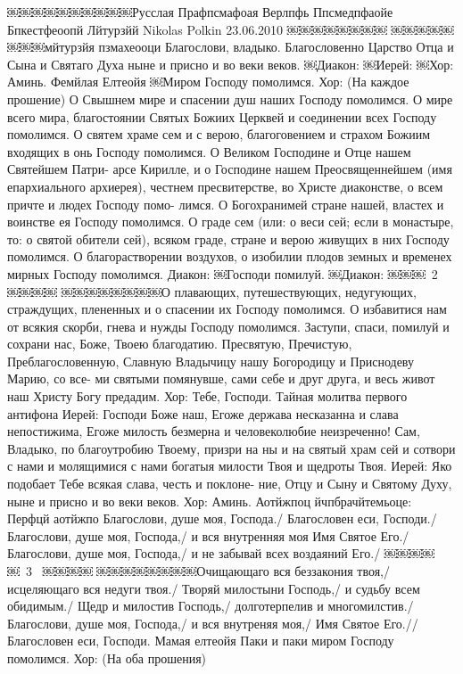 ￼￼￼￼￼￼￼￼￼￼Русслая Прафпсмафоая Верлпфь
Ппсмедпфаойе Бпкестфеоопй Лйтурзйй
Nikolas Polkin 23.06.2010
￼￼￼￼￼￼￼￼
￼￼￼￼￼￼￼￼мйтурзйя пзмахеооци
Благослови, владыко.
Благословенно Царство Отца и Сына и Святаго
Духа ныне и присно и во веки веков.
￼Диакон:
￼Иерей:
￼Хор: Аминь.
Фемйлая Елтеойя
￼Миром Господу помолимся.
Хор: (На каждое прошение)
О Свышнем мире и спасении душ наших Господу помолимся.
О мире всего мира, благостоянии Святых Божиих Церквей и соединении всех Господу помолимся.
О святем храме сем и с верою, благоговением и страхом Божиим входящих в онь Господу помолимся.
О Великом Господине и Отце нашем Святейшем Патри- арсе Кирилле, и о Господине нашем Преосвященнейшем (имя епархиального архиерея), честнем пресвитерстве, во Христе диаконстве, о всем причте и людех Господу помо- лимся.
О Богохранимей стране нашей, властех и воинстве ея Господу помолимся.
О граде сем (или: о веси сей; если в монастыре, то: о святой обители сей), всяком граде, стране и верою живущих в них Господу помолимся.
О благорастворении воздухов, о изобилии плодов земных и временех мирных Господу помолимся.
Диакон:
￼Господи помилуй.
￼Диакон:
￼￼￼~2~
￼￼￼￼
￼￼￼￼￼￼￼￼О плавающих, путешествующих, недугующих, страждущих, плененных и о спасении их Господу помолимся.
О избавитися нам от всякия скорби, гнева и нужды Господу помолимся.
Заступи, спаси, помилуй и сохрани нас, Боже, Твоею благодатию.
Пресвятую, Пречистую, Преблагословенную, Славную Владычицу нашу Богородицу и Приснодеву Марию, со все- ми святыми помянувше, сами себе и друг друга, и весь живот наш Христу Богу предадим.
Хор: Тебе, Господи.
Тайная молитва первого антифона
Иерей: Господи Боже наш, Егоже держава несказанна и слава непостижима, Егоже милость безмерна и человеколюбие неизреченно! Сам, Владыко, по благоутробию Твоему, призри на ны и на святый храм
сей и сотвори с нами и молящимися с нами богатыя милости Твоя и щедроты Твоя.
Иерей: Яко подобает Тебе всякая слава, честь и поклоне- ние, Отцу и Сыну и Святому Духу, ныне и присно и во веки веков.
Хор: Аминь.
Аотйжпоц йчпбрачйтемьоце:
Перфцй аотйжпо
Благослови, душе моя, Господа./ Благословен еси, Господи./ Благослови, душе моя, Господа,/ и вся внутренняя моя Имя Святое Его./
Благослови, душе моя, Господа,/ и не забывай всех воздаяний Его./
￼￼￼￼￼~3~
￼￼￼￼
￼￼￼￼￼￼￼￼Очищающаго вся беззакония твоя,/ исцеляющаго вся недуги твоя./
Творяй милостыни Господь,/ и судьбу всем обидимым./ Щедр и милостив Господь,/ долготерпелив и многомилстив./
Благослови, душе моя, Господа,/ и вся внутреняя моя,/ Имя Святое Его.// Благословен еси, Господи.
Мамая елтеойя
Паки и паки миром Господу помолимся. Хор: (На оба прошения)
